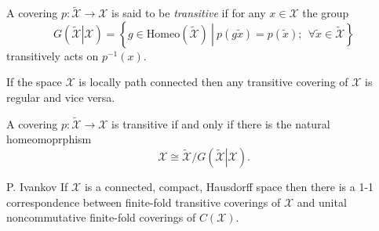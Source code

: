 \documentclass{beamer}
\theoremstyle{plain}
\begin{document}
\begin{frame}

\begin{definition}
	A covering $ p:\widetilde{\mathcal  X}\to \mathcal  X$ is said to be \textit{transitive} if for any $x \in \mathcal  X$ the group
	$$
	G\left(\left.\widetilde{\mathcal  X} \right|\mathcal  X\right)= \left\{ \left.g \in \text{Homeo}\left(\widetilde{\mathcal X} \right)~\right|~ p(g\widetilde{x}) = p(\widetilde{x});~~\forall \widetilde{x} \in \widetilde{\mathcal  X}\right\} 
	$$
	transitively acts on $p^{-1}\left(x\right)$.
\end{definition}
\begin{fact}
	If the space $ \mathcal  X$ is locally path connected then any transitive covering  of $ \mathcal  X$  is regular and vice versa.
\end{fact}
\begin{fact}
	A covering $ p:\widetilde{\mathcal  X}\to \mathcal  X$ is {transitive} if and only if there is the natural homeomoprphism
	$$
\mathcal  X \cong \widetilde{\mathcal  X}/		G\left(\left.\widetilde{\mathcal  X} \right|\mathcal  X\right).
	$$
	
\end{fact}
\end{frame}
\begin{frame}
\begin{lemma}
	\alert{P. Ivankov}
	If $\mathcal  X$ is a connected, compact, Hausdorff space then there is a 1-1 correspondence between finite-fold transitive coverings of $\mathcal  X$ and unital noncommutative finite-fold  coverings of $C\left(\mathcal  X\right)$.
\end{lemma}
\end{frame}
\end{document}
